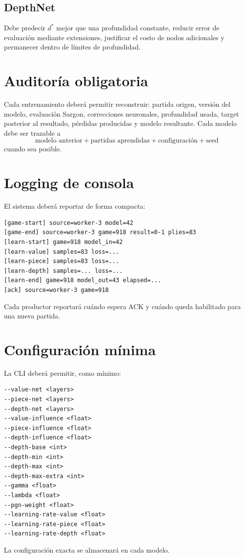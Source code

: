 \documentclass[11pt,a4paper]{article}
\begin{document}
\subsection{DepthNet}
Debe predecir $d^*$ mejor que una profundidad constante, reducir error de evaluación mediante extensiones, justificar el costo de nodos adicionales y permanecer dentro de límites de profundidad.

\section{Auditoría obligatoria}
Cada entrenamiento deberá permitir reconstruir: partida origen, versión del modelo, evaluación Sargon, correcciones neuronales, profundidad usada, target posterior al resultado, pérdidas producidas y modelo resultante. Cada modelo debe ser trazable a
\[
\text{modelo anterior}+\text{partidas aprendidas}+\text{configuración}+\text{seed}
\]
cuando sea posible.

\section{Logging de consola}
El sistema deberá reportar de forma compacta:
\begin{lstlisting}
[game-start] source=worker-3 model=42
[game-end] source=worker-3 game=918 result=0-1 plies=83
[learn-start] game=918 model_in=42
[learn-value] samples=83 loss=...
[learn-piece] samples=83 loss=...
[learn-depth] samples=... loss=...
[learn-end] game=918 model_out=43 elapsed=...
[ack] source=worker-3 game=918
\end{lstlisting}
Cada productor reportará cuándo espera ACK y cuándo queda habilitado para una nueva partida.

\section{Configuración mínima}
La CLI deberá permitir, como mínimo:
\begin{lstlisting}
--value-net <layers>
--piece-net <layers>
--depth-net <layers>
--value-influence <float>
--piece-influence <float>
--depth-influence <float>
--depth-base <int>
--depth-min <int>
--depth-max <int>
--depth-max-extra <int>
--gamma <float>
--lambda <float>
--pgn-weight <float>
--learning-rate-value <float>
--learning-rate-piece <float>
--learning-rate-depth <float>
\end{lstlisting}
La configuración exacta se almacenará en cada modelo.
\end{document}
